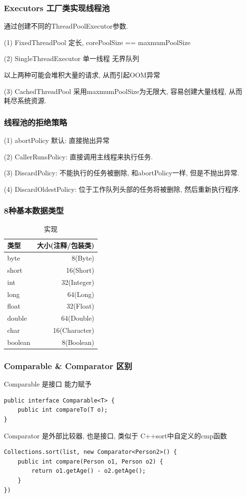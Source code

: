 \documentclass[UTF8]{ctexart}
\begin{document}
\subsubsection{Executors 工厂类实现线程池}
通过创建不同的ThreadPoolExecutor参数.\par
(1) FixedThreadPool 定长, corePoolSize == maxmumPoolSize   \par
(2) SingleThreadExecutor 单一线程 无界队列 \par
以上两种可能会堆积大量的请求, 从而引起OOM异常 \par
(3) CachedThreadPool 采用maxmumPoolSize为无限大, 容易创建大量线程, 从而耗尽系统资源. \par

\subsubsection{线程池的拒绝策略}
(1) abortPolicy 默认: 直接抛出异常 \par
(2) CallerRunsPolicy:  直接调用主线程来执行任务. \par
(3) DiscardPolicy: 不能执行的任务被删除, 和abortPolicy一样, 但是不抛出异常. \par
(4) DiscardOldestPolicy: 位于工作队列头部的任务将被删除, 然后重新执行程序. \par
\subsubsection{8种基本数据类型}
\begin{table}[!htbp]
	\centering
	\caption{实现}
	\begin{tabular}{|l|r|}
		
		\hline
		类型&大小(注释/包装类)\\
		\hline
		byte&8(Byte)\\
		\hline
		short&16(Short)\\
		\hline
		int&32(Integer)\\
		\hline
		long&64(Long)\\
		\hline
		float&32(Float)\\
		\hline
		double&64(Double)\\
		\hline
		char&16(Character)\\
		\hline
		boolean&8(Boolean)\\
		\hline
	\end{tabular}
\end{table}
\subsubsection{Comparable \& Comparator 区别}
Comparable 是接口 能力赋予
\begin{lstlisting}
public interface Comparable<T> {
	public int compareTo(T o);
}
\end{lstlisting}
Comparator 是外部比较器, 也是接口, 类似于 C++sort中自定义的cmp函数
\begin{lstlisting}
Collections.sort(list, new Comparator<Person2>() {
	public int compare(Person o1, Person o2) {
		return o1.getAge() - o2.getAge();
	}
})
\end{lstlisting}
\end{document}
